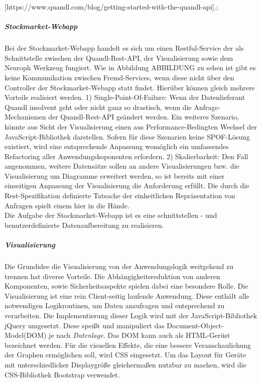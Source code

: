 [https://www.quandl.com/blog/getting-started-with-the-quandl-api].\linebreak;

\subparagraph{Stockmarket-Webapp}
Bei der Stockmarket-Webapp handelt es sich um einen Restful-Service der als Schnittstelle zwischen der Quandl-Rest-API, der Visualisierung sowie dem Neuroph Werkzeug fungiert. Wie in Abbildung ABBILDUNG zu sehen ist gibt es keine Kommunikation zwischen Fremd-Services, wenn diese nicht über den Controller der Stockmarket-Webapp statt findet. Hierüber können gleich mehrere Vorteile realisiert werden. 
1) Single-Point-Of-Failure: Wenn der Datenlieferant Quandl insolvent geht oder nicht ganz so drastisch, wenn die Anfrage-Mechanismen der Quandl-Rest-API geändert werden. Ein weiteres Szenario, könnte aus Sicht der Visualisierung einen aus Performance-Bedingten Wechsel der JavaScript-Bibliothek darstellen. Sofern für diese Szenarien keine SPOF-Lösung existiert, wird eine entsprechende Anpassung womöglich ein umfassendes Refactoring aller Anwendungskoponenten erfordern. 
2) Skalierbarkeit: Den Fall angenommen, weitere Datensätze sollen an andere Visualisierungen bzw. die Visualisierung um Diagramme erweitert werden, so ist bereits mit einer einseitigen Anpassung der Visualisierung die Anforderung erfüllt. Die durch die Rest-Spezifikation definierte Tatsache der einheitlichen Repräsentation von Anfragen spielt einem hier in die Hände. \\
Die Aufgabe der Stockmarket-Webapp ist es eine schnittstellen - und benutzerdefinierte Datenaufbereitung zu realisieren. 

\subparagraph{Visualisierung}
Die Grundidee die Visualisierung von der Anwendungslogik weitgehend zu trennen hat diverse Vorteile. Die Abhängigkeitsreduktion von anderen Komponenten, sowie Sicherheitsaspekte spielen dabei eine besondere Rolle. 
Die Visualisierung ist eine rein Client-seitig laufende Anwendung. Diese enthält alle notwendigen Logikroutinen, um Daten anzufragen und entsprechend zu verarbeiten. Die Implementierung dieser Logik wird mit der JavaScript-Bibliothek jQuery umgesetzt. Diese speißt und manipuliert das Document-Object-Model(DOM) je nach \emph{Datenlage}. Das DOM kann auch als HTML-Gerüst bezeichnet werden. Für die visuellen Effekte, die eine bessere Veranschaulichung der Graphen ermöglichen soll, wird CSS eingesetzt. Um das Layout für Geräte mit unterschiedlicher Displaygröße gleichermaßen nutzbar zu machen, wird die CSS-Bibliothek Bootstrap verwendet. 

